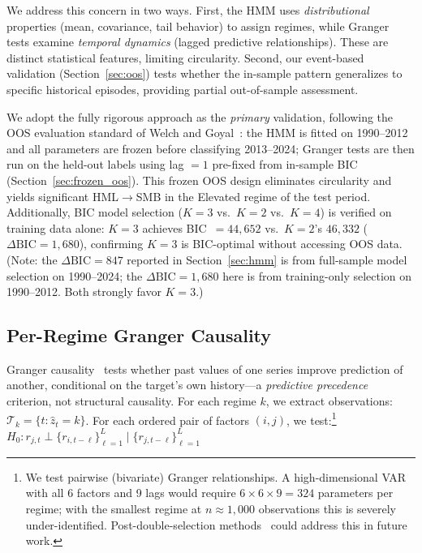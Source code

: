 \documentclass[sigconf,anonymous]{acmart}
\begin{document}
We address this concern in two ways. First, the HMM uses \emph{distributional}
properties (mean, covariance, tail behavior) to assign regimes, while Granger
tests examine \emph{temporal dynamics} (lagged predictive relationships). These
are distinct statistical features, limiting circularity. Second, our event-based
validation (Section~\ref{sec:oos}) tests whether the in-sample pattern generalizes
to specific historical episodes, providing partial out-of-sample assessment.

We adopt the fully rigorous approach as the \emph{primary} validation,
following the OOS evaluation standard of Welch and Goyal~\cite{welch2008comprehensive}:
the HMM is fitted on 1990--2012 and all parameters are frozen before
classifying 2013--2024; Granger tests are then run on the held-out labels
using lag $= 1$ pre-fixed from in-sample BIC
(Section~\ref{sec:frozen_oos}). This frozen OOS design eliminates circularity
and yields significant HML$\to$SMB in the Elevated regime of the test period.
Additionally, BIC model selection ($K=3$ vs.\ $K=2$ vs.\ $K=4$) is verified on
training data alone: $K=3$ achieves BIC~$= 44{,}652$ vs.\ $K=2$'s $46{,}332$
($\Delta\text{BIC} = 1{,}680$), confirming $K=3$ is BIC-optimal without
accessing OOS data. (Note: the $\Delta\text{BIC} = 847$ reported in
Section~\ref{sec:hmm} is from full-sample model selection on 1990--2024;
the $\Delta\text{BIC} = 1{,}680$ here is from training-only selection on
1990--2012. Both strongly favor $K=3$.)

\subsection{Per-Regime Granger Causality}
\label{sec:granger_method}

Granger causality~\cite{granger1969investigating,shojaie2022granger} tests whether past values
of one series improve prediction of another, conditional on the target's own history---a
\emph{predictive precedence} criterion, not structural causality.
For each regime $k$, we extract observations: $\mathcal{T}_k = \{t : \hat{z}_t = k\}$.
For each ordered pair of factors $(i, j)$, we test:\footnote{We test pairwise
(bivariate) Granger relationships. A high-dimensional VAR with all 6 factors and 9 lags
would require $6 \times 6 \times 9 = 324$ parameters per regime; with the smallest regime
at $n \approx 1{,}000$ observations this is severely under-identified. Post-double-selection
methods~\cite{hecq2023granger} could address this in future work.}
$H_0: r_{j,t} \perp \{r_{i,t-\ell}\}_{\ell=1}^{L} \mid \{r_{j,t-\ell}\}_{\ell=1}^{L}$
\end{document}
